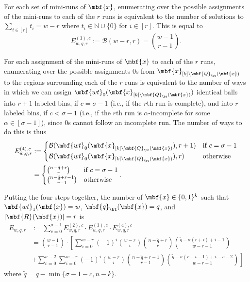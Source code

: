 For each set of mini-runs of $\mbf{x}$, enumerating over the possible assignments of the mini-runs to each of the $r$ runs is equivalent to the number of solutions to $\sum_{i\in[r]}t_i = w-r$ where $t_i \in \mathbb{N}\cup\{0\}$ for $i\in[r]$. This is equal to$$E_{w,q,r}^{(3),c} := \mathcal{B}(w-r, r) = {w-1 \choose r-1}.$$

For each assignment of the mini-runs of $\mbf{x}$ to each of the $r$ runs, enumerating over the possible assignments $0$s from $\mbf{x}_{[k]\setminus \mbf{Q}_{\bt}(\mbf{x})}$ to the regions surrounding each of the $r$ runs is equivalent to the number of ways in which we can assign $\mbf{wt}_0(\mbf{x}_{[k]\setminus \mbf{Q}_{\bt}(\mbf{x})})$ identical balls into $r+1$ labeled bins, if $c = \sigma-1$ (i.e., if the $r$th run is complete), and into $r$ labeled bins, if $c < \sigma-1$ (i.e., if the $r$th run is $\alpha$-incomplete for some $\alpha \in [\sigma-1]$), since $0$s cannot follow an incomplete run. The number of ways to do this is thus
\begin{align*}
E_{w,q,r}^{(4),c}  &:= \begin{cases}\mathcal{B}(\mbf{wt}_0(\mbf{x}_{[k]\setminus \mbf{Q}_{\bt}(\mbf{x})}),r+1) &\textrm{if }c=\sigma-1\\\mathcal{B}(\mbf{wt}_0(\mbf{x}_{[k]\setminus \mbf{Q}_{\bt}(\mbf{x})}),r)&\textrm{otherwise}\end{cases} \\
&= \begin{cases}{n-\tilde{q}+r \choose r} &\textrm{if }c=\sigma-1\\{n-\tilde{q}+r-1 \choose r-1}&\textrm{otherwise}\end{cases}.
\end{align*}

Putting the four steps together, the number of $\mbf{x} \in \{0,1\}^{k}$ such that $\mbf{wt}_1(\mbf{x}) = w$, $\mbf{q}_{\bt}(\mbf{x}) = q$, and $|\mbf{R}(\mbf{x})| = r$ is
\begin{align*}
E_{w,q,r} &:= \sum_{c=0}^{\sigma-1}E_{w,q,r}^{(2),c}\cdot E_{w,q,r}^{(3),c}\cdot E_{w,q,r}^{(4),c} \\
&= {w-1 \choose r-1}\cdot\left[\sum_{i=0}^{w-r} (-1)^i {w-r \choose i}{n-\tilde{q}+r \choose r} {\tilde{q} -\sigma(r+i) + i-1 \choose w-r-1}\right.\\&\left.+\sum_{c=0}^{\sigma-2}\sum_{i=0}^{w-r} (-1)^i {w-r \choose i}{n-\tilde{q}+r-1 \choose r-1} {\tilde{q} -\sigma(r+i-1) + i-c-2 \choose w-r-1}\right]
\end{align*}
where $\tilde{q} = q - \min\{\sigma-1-c,n-k\}$.

